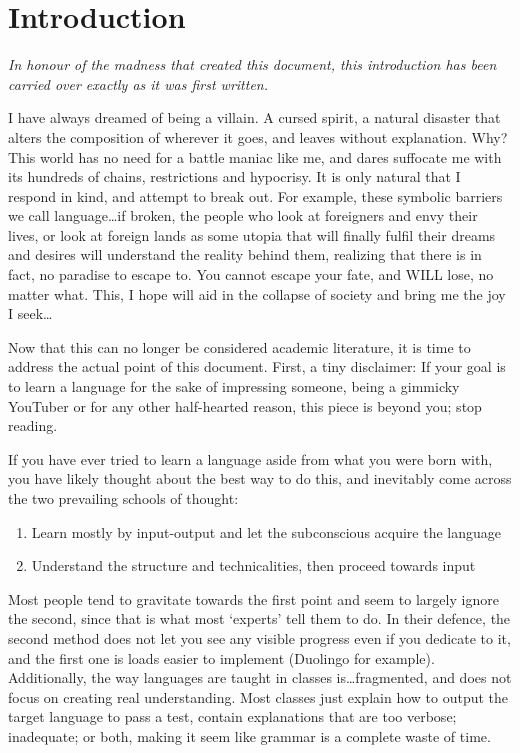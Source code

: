 \chapter{Introduction} \label{chap:int}
\textit{In honour of the madness that created this document, this introduction has been carried over exactly as it was first written.}

I have always dreamed of being a villain. A cursed spirit, a natural disaster that alters the composition of wherever it goes, and leaves without explanation. Why? This world has no need for a battle maniac like me, and dares suffocate me with its hundreds of chains, restrictions and hypocrisy. It is only natural that I respond in kind, and attempt to break out. For example, these symbolic barriers we call language\ldots if broken, the people who look at foreigners and envy their lives, or look at foreign lands as some utopia that will finally fulfil their dreams and desires will understand the reality behind them, realizing that there is in fact, no paradise to escape to. You cannot escape your fate, and WILL lose, no matter what. This, I hope will aid in the collapse of society and bring me the joy I seek\ldots

Now that this can no longer be considered academic literature, it is time to address the actual point of this document. First, a tiny disclaimer: If your goal is to learn a language for the sake of impressing someone, being a gimmicky YouTuber or for any other half-hearted reason, this piece is beyond you; stop reading. 

If you have ever tried to learn a language aside from what you were born with, you have likely thought about  the best way to do this, and inevitably come across the two prevailing schools of thought:
\begin{enumerate}
    \item Learn mostly by input-output and let the subconscious acquire the language
    \item Understand the structure and technicalities, then proceed towards input
\end{enumerate}
Most people tend to gravitate towards the first point and seem to largely ignore the second, since that is what most `experts' tell them to do. In their defence, the second method does not let you see any visible progress even if you dedicate to it, and the first one is loads easier to implement (Duolingo for example). Additionally,  the way languages are taught in  classes is\ldots fragmented, and does not focus on creating real understanding. Most classes just explain how to output  the target language to pass a test,  contain explanations that are too verbose; inadequate; or both, making it seem like grammar is a complete waste of time. 

